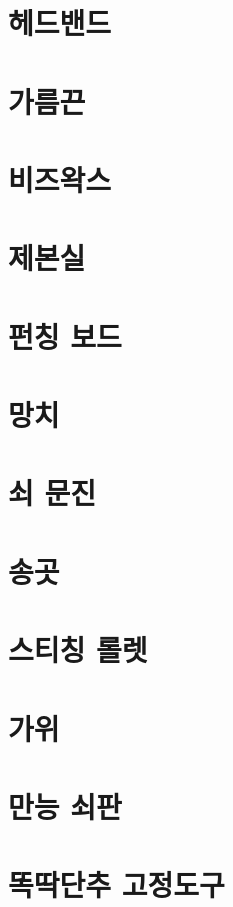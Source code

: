 \documentclass[12pt, a4paper, oneside]{book}
\begin{document}
	\section{헤드밴드}

	\section{가름끈}

	\section{비즈왁스}

	\section{제본실}


	\section{펀칭 보드}

	\section{망치}

	\section{쇠 문진}

	\section{송곳}

	\section{스티칭 롤렛}

	\section{가위}

	\section{만능 쇠판}

	\section{똑딱단추 고정도구}
\end{document}
